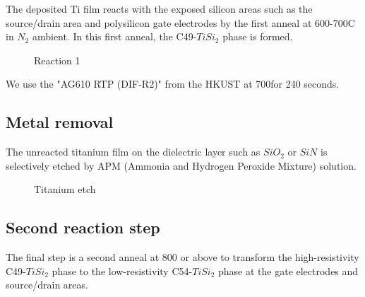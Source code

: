 The deposited Ti film reacts with the exposed silicon areas such as the source/drain area and polysilicon gate electrodes by the first anneal at 600-700\degree C in $N_2$ ambient.
In this first anneal, the C49-$TiSi_2$ phase is formed.

\begin{figure}[H]
	\centering
	\begin{tikzpicture}[node distance = 3cm, auto, thick,scale=\CrossSectionOnly, every node/.style={transform shape}]
		
	\end{tikzpicture}
	\drawStepArrow{}
	\begin{tikzpicture}[node distance = 3cm, auto, thick,scale=\CrossSectionOnly, every node/.style={transform shape}]
		
	\end{tikzpicture}
	\caption{Reaction 1}
\end{figure}

We use the "AG610 RTP (DIF-R2)" from the HKUST at 700\degreesC for 240 seconds.

\subsection{Metal removal}

The unreacted titanium film on the dielectric layer such as $SiO_2$ or $SiN$ is selectively etched by APM (Ammonia and Hydrogen Peroxide Mixture) solution.

\begin{figure}[H]
	\centering
	\begin{tikzpicture}[node distance = 3cm, auto, thick,scale=\CrossSectionOnly, every node/.style={transform shape}]
		
	\end{tikzpicture}
	\drawStepArrow{}
	\begin{tikzpicture}[node distance = 3cm, auto, thick,scale=\CrossSectionOnly, every node/.style={transform shape}]
		
	\end{tikzpicture}
	\caption{Titanium etch}
\end{figure}

\subsection{Second reaction step}

The final step is a second anneal at 800 \degreesC or above to transform the high-resistivity C49-$TiSi_2$ phase to the low-resistivity C54-$TiSi_2$ phase at the gate electrodes and source/drain areas.

